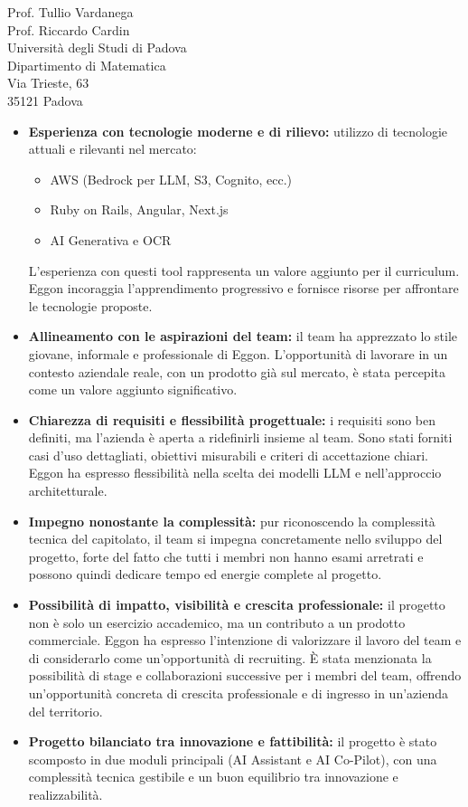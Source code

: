 \documentclass[a4paper,11pt]{letter}
\begin{document}
\begin{letter}{Prof. Tullio Vardanega\\Prof. Riccardo Cardin\\Universit\`a degli Studi di Padova\\Dipartimento di Matematica\\Via Trieste, 63\\35121 Padova}
\begin{itemize}
    \item \textbf{Esperienza con tecnologie moderne e di rilievo:} utilizzo di tecnologie attuali e rilevanti nel mercato:
    \begin{itemize}
        \item AWS (Bedrock per LLM, S3, Cognito, ecc.)
        \item Ruby on Rails, Angular, Next.js
        \item AI Generativa e OCR
    \end{itemize}
    L'esperienza con questi tool rappresenta un valore aggiunto per il curriculum. Eggon incoraggia l'apprendimento progressivo e fornisce risorse per affrontare le tecnologie proposte.

    \item \textbf{Allineamento con le aspirazioni del team:} il team ha apprezzato lo stile giovane, informale e professionale di Eggon. L'opportunità di lavorare in un contesto aziendale reale, con un prodotto già sul mercato, è stata percepita come un valore aggiunto significativo.

    \item \textbf{Chiarezza di requisiti e flessibilità progettuale:} i requisiti sono ben definiti, ma l'azienda è aperta a ridefinirli insieme al team. Sono stati forniti casi d'uso dettagliati, obiettivi misurabili e criteri di accettazione chiari. Eggon ha espresso flessibilità nella scelta dei modelli LLM e nell'approccio architetturale.

    \item \textbf{Impegno nonostante la complessità:} pur riconoscendo la complessità tecnica del capitolato, il team si impegna concretamente nello sviluppo del progetto, forte del fatto che tutti i membri non hanno esami arretrati e possono quindi dedicare tempo ed energie complete al progetto.
    
    \item \textbf{Possibilità di impatto, visibilità e crescita professionale:} il progetto non è solo un esercizio accademico, ma un contributo a un prodotto commerciale. Eggon ha espresso l'intenzione di valorizzare il lavoro del team e di considerarlo come un'opportunità di recruiting. È stata menzionata la possibilità di stage e collaborazioni successive per i membri del team, offrendo un'opportunità concreta di crescita professionale e di ingresso in un'azienda del territorio.
    
    \item \textbf{Progetto bilanciato tra innovazione e fattibilità:} il progetto è stato scomposto in due moduli principali (AI Assistant e AI Co-Pilot), con una complessità tecnica gestibile e un buon equilibrio tra innovazione e realizzabilità.
\end{itemize}




\end{letter}
\end{document}
